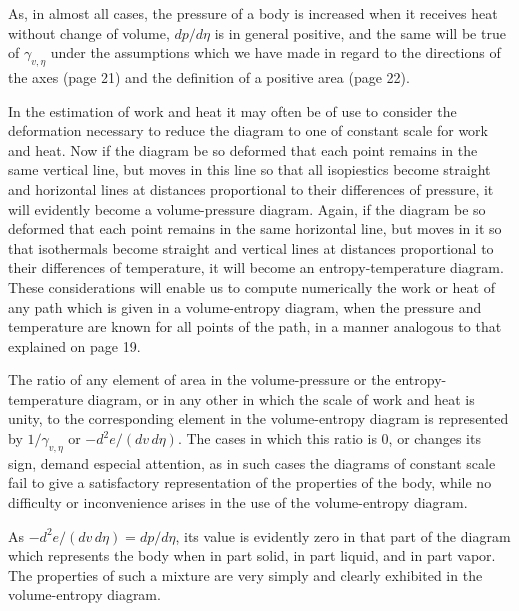 \documentclass[11pt]{article}
\begin{document}
As, in almost all cases, the pressure of a body is increased when it receives heat without change of volume, $dp/d\eta$ is in general positive, and the same will be true of $\gamma_{v,\eta}$ under the assumptions which we have made in regard to the directions of the axes (page 21) and the definition of a positive area (page 22).

In the estimation of work and heat it may often be of use to consider the deformation necessary to reduce the diagram to one of constant scale for work and heat. Now if the diagram be so deformed that each point remains in the same vertical line, but moves in this line so that all isopiestics become straight and horizontal lines at distances proportional to their differences of pressure, it will evidently become a volume-pressure diagram. Again, if the diagram be so deformed that each point remains in the same horizontal line, but moves in it so that isothermals become straight and vertical lines at distances proportional to their differences of temperature, it will become an entropy-temperature diagram. These considerations will enable us to compute numerically the work or heat of any path which is given in a volume-entropy diagram, when the pressure and temperature are known for all points of the path, in a manner analogous to that explained on page 19.

The ratio of any element of area in the volume-pressure or the entropy-temperature diagram, or in any other in which the scale of work and heat is unity, to the corresponding element in the volume-entropy diagram is represented by $1/\gamma_{v,\eta}$ or $-d^2e/(dv\,d\eta)$. The cases in which this ratio is 0, or changes its sign, demand especial attention, as in such cases the diagrams of constant scale fail to give a satisfactory representation of the properties of the body, while no difficulty or inconvenience arises in the use of the volume-entropy diagram.

As $-d^2e/(dv\,d\eta)=dp/d\eta$, its value is evidently zero in that part of the diagram which represents the body when in part solid, in part liquid, and in part vapor. The properties of such a mixture are very simply and clearly exhibited in the volume-entropy diagram.
\end{document}
